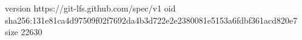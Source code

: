 version https://git-lfs.github.com/spec/v1
oid sha256:131e81ca4d97509f02f7692da4b3d722e2e2380081e5153a6fdbf361acd820e7
size 22630
